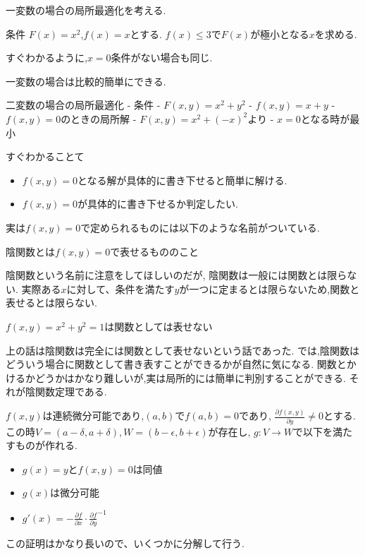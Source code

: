 一変数の場合の局所最適化を考える.
\begin{epl}
条件
$F(x) = x^2$,$f(x) = x$とする.
$f(x) \le 3$で$F(x)$が極小となる$x$を求める.

すぐわかるように,$x = 0$条件がない場合も同じ.
\end{epl}
一変数の場合は比較的簡単にできる.

二変数の場合の局所最適化
- 条件
  - $F(x, y) = x^2 + y^2$
  - $f(x, y) = x + y$
- $f(x ,y) = 0$のときの局所解
  - $F(x , y) = x^2 + (-x)^2$より
  - $x = 0$となる時が最小

すぐわかることて
\begin{itemize}
  \item $f(x, y) = 0$となる解が具体的に書き下せると簡単に解ける.
  \item  $f(x ,y) = 0$が具体的に書き下せるか判定したい.
\end{itemize}

実は$f(x,y) = 0$で定められるものには以下のような名前がついている.
\begin{dfn}
陰関数とは$f(x, y) = 0$で表せるもののこと
\end{dfn}

陰関数という名前に注意をしてほしいのだが,
陰関数は一般には関数とは限らない.
実際ある$x$に対して、条件を満たす$y$が一つに定まるとは限らないため,関数と表せるとは限らない.

\begin{epl}
$f(x , y) = x^2 + y^2 = 1$は関数としては表せない
\end{epl}

上の話は陰関数は完全には関数として表せないという話であった.
では,陰関数はどういう場合に関数として書き表すことができるかが自然に気になる.
関数とかけるかどうかはかなり難しいが,実は局所的には簡単に判別することができる.
それが陰関数定理である.

\begin{thm}
$f(x ,y)$は連続微分可能であり,$(a, b)$で$f(a , b) = 0$であり,
$\frac{\partial f(x, y)}{\partial y} \neq 0$とする.
この時$V = (a - \delta, a + \delta),W = (b - \epsilon , b + \epsilon)$が存在し,
$g:V \to W$で以下を満たすものが作れる.
\begin{itemize}
  \item $g(x) = y$と$f(x, y) = 0$は同値
  \item $g(x)$は微分可能
  \item $g'(x) = - \frac{\partial f}{\partial x} \cdot \frac{\partial f}{\partial y}^{-1}$
\end{itemize}
\end{thm}
この証明はかなり長いので、いくつかに分解して行う.

